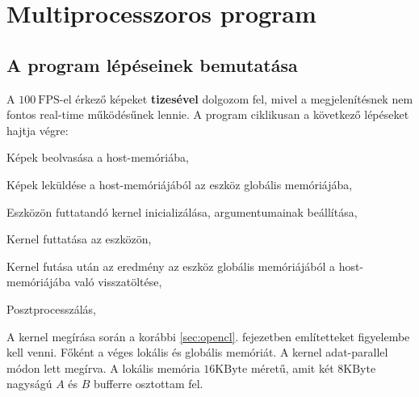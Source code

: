 \chapter{Multiprocesszoros program}
\section{A program lépéseinek bemutatása}
	A $100\ \mathrm{FPS}$-el érkező képeket \textbf{tizesével} dolgozom fel, mivel a megjelenítésnek
	nem fontos real-time működésűnek lennie. 
	A program ciklikusan a következő lépéseket hajtja végre:
	\begin{enumerate*}
		\item Képek beolvasása a host-memóriába,
		\item Képek leküldése a host-memóriájából az eszköz globális memóriájába,
		\item Eszközön futtatandó kernel inicializálása, argumentumainak beállítása,
		\item Kernel futtatása az eszközön,
		\item Kernel futása után az eredmény az eszköz globális memóriájából a host-memóriájába való
		visszatöltése,
		\item Posztprocesszálás,
	\end{enumerate*}
	A kernel megírása során a korábbi \ref{sec:opencl}. fejezetben említetteket figyelembe kell venni.
	Főként a véges lokális és globális memóriát. A kernel adat-parallel módon lett megírva.
	A lokális memória $16 \mathrm{KByte}$ méretű, amit két $8 \mathrm{KByte}$ nagyságú $A$ és $B$
	bufferre osztottam fel.
	
